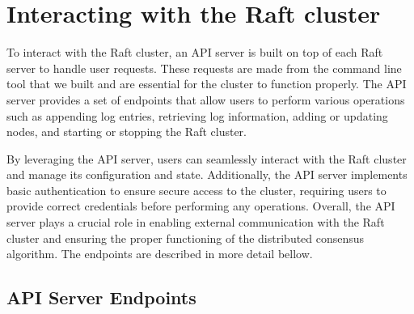 \documentclass{article}
\begin{document}
\section{Interacting with the Raft cluster}
To interact with the Raft cluster, an API server is built on top of each Raft server to handle
user requests. These requests are made from the command line tool that we built and are essential
for the cluster to function properly. The API server provides a set of endpoints that allow users
to perform various operations such as appending log entries, retrieving log information, adding or
updating nodes, and starting or stopping the Raft cluster.

By leveraging the API server, users can seamlessly interact with the Raft cluster and manage its
configuration and state. Additionally, the API server implements basic authentication to ensure
secure access to the cluster, requiring users to provide correct credentials before performing any
operations. Overall, the API server plays a crucial role in enabling external communication with
the Raft cluster and ensuring the proper functioning of the distributed consensus algorithm. The
endpoints are described in more detail bellow.

\subsection{API Server Endpoints}
\end{document}
